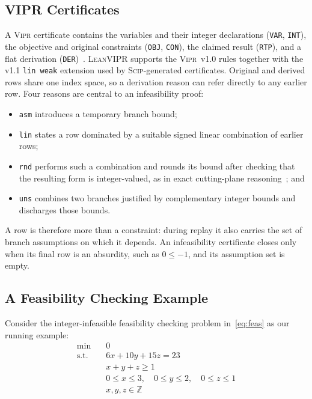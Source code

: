 \documentclass{article}
\newcommand{\code}[1]{\textcolor{blue!70!black}{\texttt{#1}}}
\newcommand{\Z}{\mathbb{Z}}
\newcommand{\tool}{\textsc{LeanVIPR}}
\newcommand{\scip}{\textsc{Scip}}
\newcommand{\vipr}{\textsc{Vipr}}
\begin{document}
\subsection{VIPR Certificates}

A \vipr{} certificate contains the variables and their integer declarations (\code{VAR}, \code{INT}), the objective and original constraints (\code{OBJ}, \code{CON}), the claimed result (\code{RTP}), and a flat derivation (\code{DER})~\citep{cheung2017verifying,wood2025satisfiability}.
\tool{} supports the \vipr~v1.0 rules together with the v1.1 \code{lin weak} extension used by \scip{}-generated certificates.
Original and derived rows share one index space, so a derivation reason can refer directly to any earlier row. Four reasons are central to an infeasibility proof:
\begin{itemize}
\item \code{asm} introduces a temporary branch bound;
\item \code{lin} states a row dominated by a suitable signed linear combination of earlier rows;
\item \code{rnd} performs such a combination and rounds its bound after checking that the resulting form is integer-valued, as in exact cutting-plane reasoning~\citep{eifler2024safe}; and
\item \code{uns} combines two branches justified by complementary integer bounds and discharges those bounds.
\end{itemize}
A row is therefore more than a constraint: during replay it also carries the set of branch assumptions on which it depends.
An infeasibility certificate closes only when its final row is an absurdity, such as $0\le-1$, and its assumption set is empty.

\subsection{A Feasibility Checking Example}
Consider the integer-infeasible feasibility checking problem in~\autoref{eq:feas} as our running example:
\begin{equation}\label{eq:feas}
\begin{aligned}
\min \quad & 0 \\
\text{s.t.} \quad & 6x + 10y + 15z = 23 \\
& x + y + z \ge 1 \\
& 0 \le x \le 3, \quad 0 \le y \le 2, \quad 0 \le z \le 1 \\
& x, y, z \in \Z
\end{aligned}
\end{equation}
\end{document}
